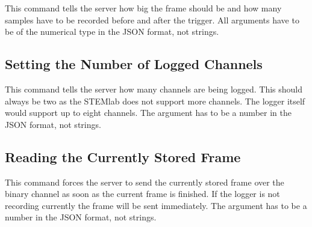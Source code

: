 This command tells the server how big the frame should be and how many samples
have to be recorded before and after  the trigger. All arguments have to be of
the numerical type in the JSON format, not strings.


\subsection{Setting the Number of Logged Channels} %
\label{subsec:devguide:server:no_of_logged_channels}

This command tells the server how  many channels are being logged. This should
always be two as the STEMlab does not support more channels. The logger itself
would support up  to eight channels.  The  argument has to be a  number in the
JSON format, not strings.


\subsection{Reading the Currently Stored Frame} %
\label{subsec:devguide:server:currently_stored_frame}

This command  forces the server  to send the  currently stored frame  over the
binary channel as soon as the current  frame is finished. If the logger is not
recording currently the frame will be sent immediately.
The   argument  has to  be a  number in  the JSON  format, not
strings.

